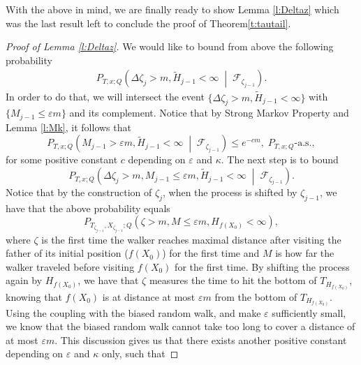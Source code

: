 \documentclass[a4paper]{amsart}
\newcommand{\hitfetak}{\widetilde{H}}
\begin{document}
With the above in mind, we are finally ready to show Lemma \ref{l:Deltaz} which was the last result left to conclude the proof of Theorem\ref{t:tautail}.
\begin{proof}[Proof of Lemma \ref{l:Deltaz}] We would like to bound from above the following probability
\begin{equation*}
    \begin{split}
        P_{T,x;Q}\left(\Delta \zeta_j > m, \hitfetak_{j-1} < \infty \; \middle | \; \mathcal{F}_{\zeta_{j-1}}\right ) .
    \end{split}
\end{equation*}
    In order to do that, we will intersect the event $\{\Delta \zeta_j > m, \hitfetak_{j-1} < \infty\}$ with $\{M_{j-1} \le \varepsilon m \}$ and its complement. Notice that by Strong Markov Property and Lemma \ref{l:Mk}, it follows that 
    \begin{equation}\label{eq:expbound1}
         P_{T,x;Q}\left(M_{j-1} > \varepsilon m, \hitfetak_{j-1} < \infty \; \middle | \; \mathcal{F}_{\zeta_{j-1}}\right ) \le e^{-cm},\; P_{T,x;Q}\text{-a.s.},
    \end{equation}
    for some positive constant $c$ depending on $\varepsilon$ and $\kappa$. The next step is to bound
    \begin{equation*}
        P_{T,x;Q}\left(\Delta \zeta_j > m, M_{j-1} \le \varepsilon m, \hitfetak_{j-1} < \infty \; \middle | \; \mathcal{F}_{\zeta_{j-1}}\right ). 
    \end{equation*}
    Notice that by the construction of $\zeta_j$, when the process is shifted by $\zeta_{j-1}$, we have that the above probability equals
    \begin{equation*}
        P_{T_{\zeta_{j-1}},X_{\zeta_{j-1}};Q}(\zeta > m,M\le \varepsilon m, H_{f(X_0)} < \infty),
    \end{equation*}
    where $\zeta$ is the first time the walker reaches maximal distance after visiting the father of its initial position ($f(X_0)$) for the first time and $M$ is how far the walker traveled before visiting $f(X_0)$ for the first time. By shifting the process again by $H_{f(X_0)}$, we have that $\zeta$ measures the time to hit the bottom of $T_{H_{f(X_0)}}$, knowing that $f(X_0)$ is at distance at most $\varepsilon m$ from the bottom of $T_{H_{f(X_0)}}$. Using the coupling with the biased random walk, and make $\varepsilon$ sufficiently small, we know that the biased random walk cannot take too long to cover a distance of at most $\varepsilon m$. This discussion gives us that there exists another positive constant depending on $\varepsilon$ and $\kappa$ only, such that

\end{proof}
\end{document}

